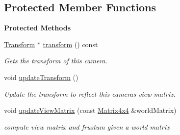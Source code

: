 \subsection*{Protected Member Functions}
\begin{Indent}\textbf{ Protected Methods}\par
\begin{DoxyCompactItemize}
\item 
\mbox{\label{classrev_1_1_camera_a8d8ebfe2a7d4538910bc3d5ff934a52b}} 
\mbox{\hyperlink{classrev_1_1_transform}{Transform}} $\ast$ \mbox{\hyperlink{classrev_1_1_camera_a8d8ebfe2a7d4538910bc3d5ff934a52b}{transform}} () const
\begin{DoxyCompactList}\small\item\em Gets the transform of this camera. \end{DoxyCompactList}\item 
\mbox{\label{classrev_1_1_camera_a2c9f30ef5098a73959e880d20c04404c}} 
void \mbox{\hyperlink{classrev_1_1_camera_a2c9f30ef5098a73959e880d20c04404c}{update\+Transform}} ()
\begin{DoxyCompactList}\small\item\em Update the transform to reflect this camera\textquotesingle{}s view matrix. \end{DoxyCompactList}\item 
\mbox{\label{classrev_1_1_camera_a7f2c034ec0c8a21a339c974535c57869}} 
void \mbox{\hyperlink{classrev_1_1_camera_a7f2c034ec0c8a21a339c974535c57869}{update\+View\+Matrix}} (const \mbox{\hyperlink{classrev_1_1_square_matrix}{Matrix4x4}} \&world\+Matrix)
\begin{DoxyCompactList}\small\item\em compute view matrix and frustum given a world matrix \end{DoxyCompactList}\end{DoxyCompactItemize}
\end{Indent}
